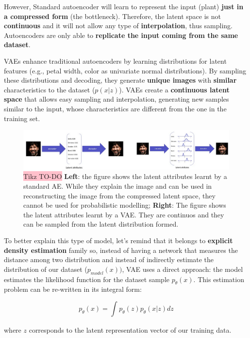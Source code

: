 However, Standard autoencoder will learn to represent the input (plant) \textbf{just in a compressed form} (the bottleneck). Therefore, the latent space is not \textbf{continuous} and it will not allow any type of \textbf{interpolation}, thus sampling. Autoencoders are only able to \textbf{replicate the input coming from the same dataset}.

VAEs enhance traditional autoencoders by learning distributions for latent features (e.g., petal width, color as univariate normal distributions). By sampling these distributions and decoding, they generate \textbf{unique images} with \textbf{similar} characteristics to the dataset ($p(x|z)$). VAEs create a \textbf{continuous latent space} that allows easy sampling and interpolation, generating new samples similar to the input, whose characteristics are different from the one in the training set.


\begin{figure}[!htbp]
    \centering
    \includegraphics[width=1\linewidth]{tikz/VAE example.png}
    \caption{{\color{red}\colorbox{pink}{Tikz TO-DO}} \textbf{Left}: the figure shows the latent attributes learnt by a standard AE. While they explain the image and can be used in reconstructing the image from the compressed latent space, they cannot be used for probabilistic modelling; \textbf{Right}: The  figure shows the latent attributes learnt by a VAE.  They are continuos and they can be sampled from the latent distribution formed.}
    \label{fig:VAE-example}
\end{figure}

To better explain this type of model, let's remind that it belongs to \textbf{explicit density estimation} family so, instead of having a network that measures the distance among two distribution and instead of indirectly estimate the distribution of our dataset ($p_{model}(x))$, VAE uses a direct approach: the model  estimates the likelihood function for the dataset sample $p_{\theta}(x)$. This estimation problem can be re-written in its integral form:

$$p_{\theta}(x)=\int_{} p_{\theta}(z)p_{\theta}(x|z)dz$$

where $z$ corresponds to the latent representation vector of our training data. 

